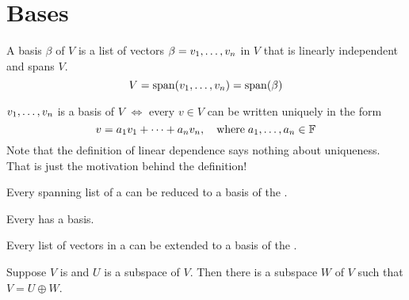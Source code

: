 \section{Bases}


\setcounter{thm}{25}
\begin{mydef} [Basis]
  A basis $\beta$ of $V$ is a list of vectors $\beta = v_1, \dots, v_n$ in $V$ that is linearly independent and spans $V$.
  \begin{equation}
    V = \operatorname{span} (v_1, \dots, v_n) = \operatorname{span} ( \beta )
  \end{equation}
\end{mydef}

\setcounter{thm}{27}
\begin{thm} 
  $v_1, \dots, v_n$ is a basis of $V$ $\iff$ every $v \in V$ can be written uniquely in the form
  \begin{equation}
    v=a_1 v_1 + \dots + a_n v_n, \quad \text{where} \; a_1, \dots, a_n \in \mathbb{F}
  \end{equation}
  Note that the definition of linear dependence says nothing about uniqueness. That is just the motivation behind the definition!
\end{thm}

\setcounter{thm}{29}
\begin{thm}  
  Every spanning list of a \vs can be reduced to a basis of the \vs.
\end{thm}

\setcounter{thm}{30}
\begin{thm} 
  Every \findimvs has a basis.
\end{thm}

\begin{thm} 
  Every \lid list of vectors in a  \findimvs can be extended to a basis of the \vs. 
\end{thm}

\begin{thm} 
  Suppose $V$ is \fd and $U$ is a subspace of $V$. Then there is a subspace $W$ of $V$ such that $V=U \oplus W$. 
\end{thm}

